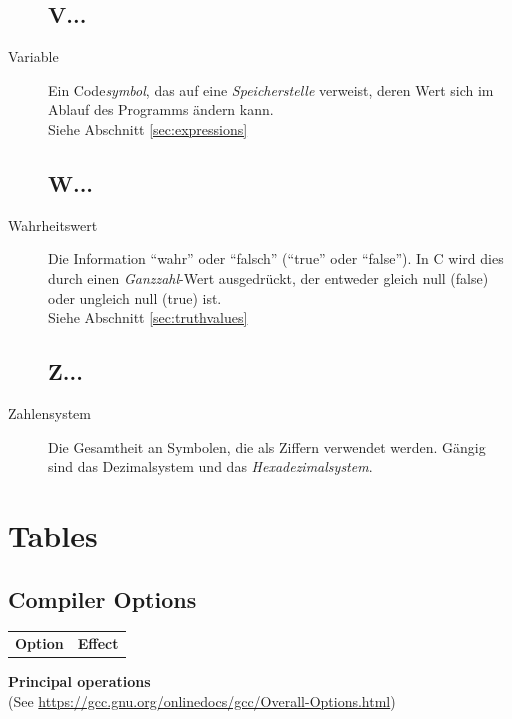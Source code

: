 \begin{appendices}
\begin{description}
\section*{V...}
\item[Variable] Ein Code\emph{symbol}, das auf eine \emph{Speicherstelle} verweist, deren Wert sich
	im Ablauf des Programms ändern kann.\\
	Siehe Abschnitt \ref{sec:expressions}

\section*{W...}
\item[Wahrheitswert] Die Information \enquote{wahr} oder \enquote{falsch} (\enquote{true} oder
	\enquote{false}). In C wird dies durch einen \emph{Ganzzahl}-Wert ausgedrückt, der entweder gleich
	null (false) oder ungleich null (true) ist.\\
	Siehe Abschnitt \ref{sec:truthvalues}

\section*{Z...}
\item[Zahlensystem] Die Gesamtheit an Symbolen, die als Ziffern verwendet werden. Gängig sind das
	Dezimalsystem und das \emph{Hexadezimalsystem}.
\end{description}



\chapter{Tables}
\section{Compiler Options}
\begin{table}[h!]

\begin{tabularx}
	{\linewidth}
	{OE}
	\toprule[1.5pt]

	\normalfont	\bfseries Option &
				\bfseries Effect
	\tabcrlf
\end{tabularx}

\vspace{6pt}
\textbf{Principal operations} \\
(See \url{https://gcc.gnu.org/onlinedocs/gcc/Overall-Options.html})


\end{table}
\end{appendices}
